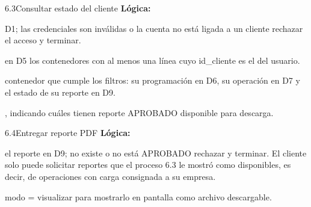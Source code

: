 \begin{minispec}{6.3}{Consultar estado del cliente}
\textbf{Lógica:}
\begin{logica}
    \item {} D1;  las credenciales son inválidas o la cuenta no está ligada a un
    cliente  rechazar el acceso y terminar.
    \item {} en D5 los contenedores con al menos una línea cuyo id\_cliente es el del
    usuario.
    \item {} contenedor que cumple los filtros:  su programación en D6,
    su operación en D7 y el estado de su reporte en D9.
    \item {} , indicando cuáles tienen reporte APROBADO
    disponible para descarga.
\end{logica}
\end{minispec}

\begin{minispec}{6.4}{Entregar reporte PDF}
\textbf{Lógica:}
\begin{logica}
    \item {} el reporte en D9;  no existe o no está APROBADO 
    rechazar y terminar. El cliente solo puede solicitar reportes que el proceso 6.3 le
    mostró como disponibles, es decir, de operaciones con carga consignada a su empresa.
    \item {} modo = visualizar   para mostrarlo en
    pantalla   como archivo descargable.
\end{logica}
\end{minispec}
